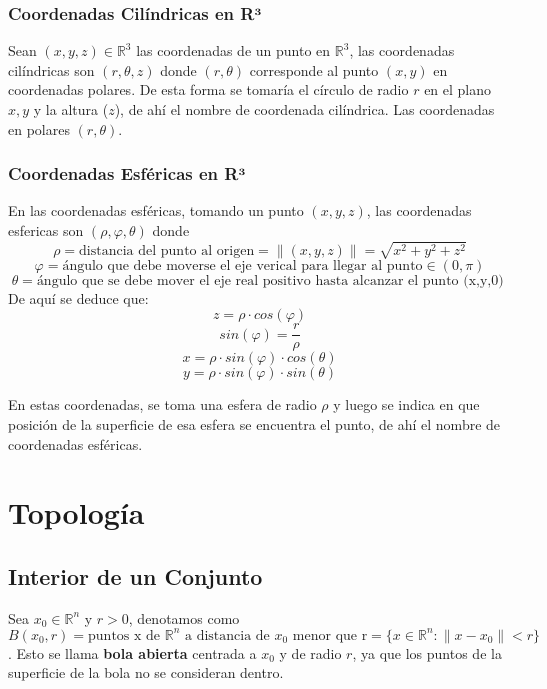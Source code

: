 \documentclass[11pt]{article}
\newcommand{\R}{\mathbb{R}}
\theoremstyle{plain}
\begin{document}
            \subsubsection{Coordenadas Cilíndricas en R³} %
            \label{subsub:coordenadas_ciĺindricas_en_r3}
                Sean $(x,y,z) \in \R^3$ las coordenadas de un punto en $\R^3$, las coordenadas cilíndricas son $(r,\theta,z)$ donde $(r,\theta)$ corresponde al punto $(x,y)$ en coordenadas polares. De esta forma se tomaría el círculo de radio $r$ en el plano $x,y$ y la altura ($z$), de ahí el nombre de coordenada cilíndrica. Las coordenadas en polares $(r,\theta)$.
            \subsubsection{Coordenadas Esféricas en R³} %
            \label{subsub:coordenadas_esfericas_en_r3}
                En las coordenadas esféricas, tomando un punto $(x,y,z)$, las coordenadas esfericas son $(\rho,\varphi,\theta)$ donde \[\rho = \text{distancia del punto al origen} = \|(x,y,z)\| = \sqrt{x^2 + y^2 + z^2} \] \[\varphi = \text{ángulo que debe moverse el eje verical para llegar al punto} \in (0,\pi)\] \[\theta = \text{ángulo que se debe mover el eje real positivo hasta alcanzar el punto (x,y,0) }\]
                De aquí se deduce que:
                \[z = \rho \cdot cos(\varphi)\]
                \[sin(\varphi) = \frac{r}{\rho} \tag{Siendo r la distancia de la proyección en el plano (x,y)}\]
                \[x = \rho \cdot sin(\varphi) \cdot cos(\theta) \]
                \[y = \rho \cdot sin(\varphi) \cdot sin(\theta)\]

                En estas coordenadas, se toma una esfera de radio $\rho$ y luego se indica en que posición de la superficie de esa esfera se encuentra el punto, de ahí el nombre de coordenadas esféricas. 
    \section{Topología} %
    \label{sec:topología}
        \subsection{Interior de un Conjunto} %
        \label{sub:interior_de_un_conjunto}
            Sea $x_0 \in \R^n$ y $r > 0$, denotamos como $B(x_0,r) = \text{puntos x de $\R^n$ a distancia de $x_0$ menor que r} = \{x \in \R^n: \|x-x_0\|< r \}$. Esto se llama \textbf{bola abierta} centrada a $x_0$ y de radio $r$, ya que los puntos de la superficie de la bola no se consideran dentro. \\
\end{document}
